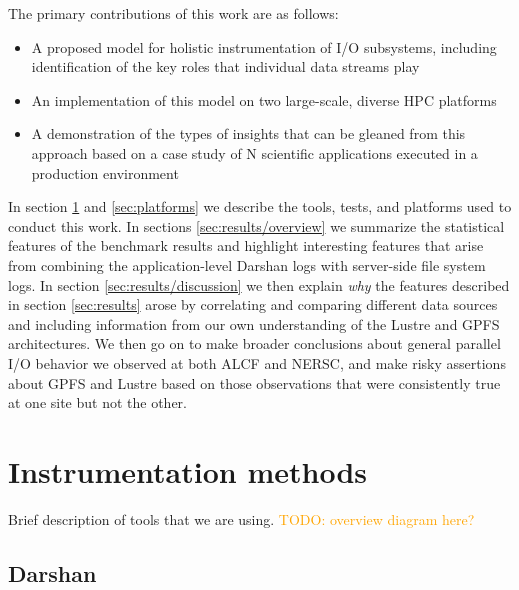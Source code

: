 \documentclass[conference,10pt,compsocconf]{IEEEtran}
\newcommand{\todo}[1]{\textcolor{Orange}{TODO: #1}}
\begin{document}

The primary contributions of this work are as follows:

\begin{itemize}
\item A proposed model for holistic instrumentation of I/O subsystems,
including identification of the key roles that individual data streams play
\item An implementation of this model on two large-scale, diverse HPC
platforms
\item A demonstration of the types of insights that can be gleaned from this
approach based on a case study of N scientific applications executed in a
production environment
\end{itemize}

In section \ref{sec:methods} and \ref{sec:platforms} we describe the tools, tests, and
platforms used to conduct this work.  In sections \ref{sec:results/overview} we summarize the
statistical features of the benchmark results and highlight interesting features
that arise from combining the application-level Darshan logs with server-side
file system logs.  In section \ref{sec:results/discussion} we then explain \emph{why} the
features described in section \ref{sec:results} arose by correlating and
comparing different data sources and including information from our own
understanding of the Lustre and GPFS architectures.  We then go on to make
broader conclusions about general parallel I/O behavior we observed at both
ALCF and NERSC, and make risky assertions about GPFS and Lustre based on those
observations that were consistently true at one site but not the other.

\section{Instrumentation methods} \label{sec:methods}

Brief description of tools that we are using.
\todo{overview diagram here?}

\subsection{Darshan} \label{sec:methods/darshan}
\end{document}
